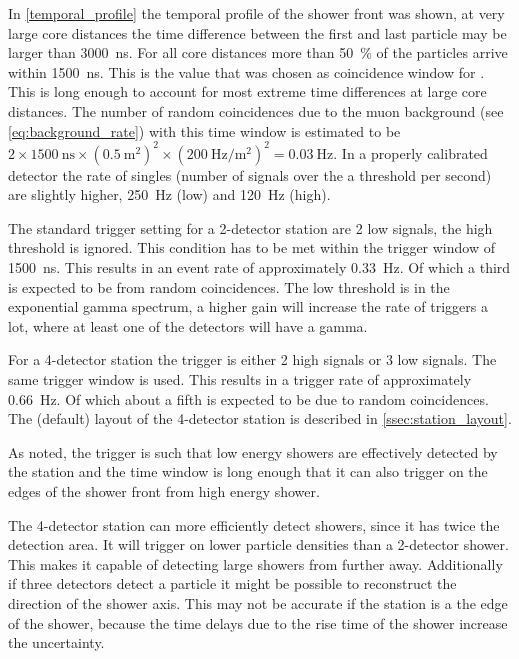 In \cref{temporal_profile} the temporal profile of the shower front was shown, at very large core distances the time difference between the first and last particle may be larger than \SI{3000}{\ns}. For all core distances more than \SI{50}{\percent} of the particles arrive within \SI{1500}{\ns}. This is the value that was chosen as coincidence window for \hisparc. This is long enough to account for most extreme time differences at large core distances. The number of random coincidences due to the muon background (see \cref{eq:background_rate}) with this time window is estimated to be $2 \times \SI{1500}{\ns} \times \left(\SI{0.5}{\meter\squared}\right)^2 \times \left(\SI{200}{\hertz\per\meter\squared}\right)^2 = \SI{0.03}{\hertz}$. In a properly calibrated detector the rate of singles (number of signals over the a threshold per second) are slightly higher, \SI{250}{\hertz} (low) and \SI{120}{\hertz} (high).

The standard trigger setting for a 2-detector station are 2 low signals, the high threshold is ignored. This condition has to be met within the trigger window of \SI{1500}{\ns}. This results in an event rate of approximately \SI{0.33}{\hertz}. Of which a third is expected to be from random coincidences. The low threshold is in the exponential gamma spectrum, a higher \pmt gain will increase the rate of triggers a lot, where at least one of the detectors will have a gamma.

For a 4-detector station the trigger is either 2 high signals or 3 low signals. The same trigger window is used. This results in a trigger rate of approximately \SI{0.66}{\hertz}. Of which about a fifth is expected to be due to random coincidences. The (default) layout of the 4-detector station is described in \cref{ssec:station_layout}.

As noted, the trigger is such that low energy showers are effectively detected by the station and the time window is long enough that it can also trigger on the edges of the shower front from high energy shower.

The 4-detector station can more efficiently detect showers, since it has twice the detection area. It will trigger on lower particle densities than a 2-detector shower. This makes it capable of detecting large showers from further away. Additionally if three detectors detect a particle it might be possible to reconstruct the direction of the shower axis. This may not be accurate if the station is a the edge of the shower, because the time delays due to the rise time of the shower increase the uncertainty.

